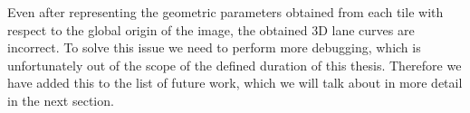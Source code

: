 Even after representing the geometric parameters obtained from each tile with respect to the global origin of the image, the obtained 3D lane curves are incorrect. To solve this issue we need to perform more debugging, which is unfortunately out of the scope of the defined duration of this thesis. Therefore we have added this to the list of future work, which we will talk about in more detail in the next section.

